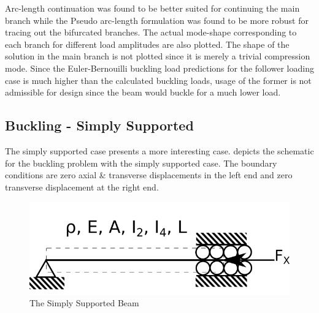 \documentclass[10pt]{article}
\begin{document}
Arc-length continuation was found to be better suited for continuing
the main branch while the Pseudo arc-length formulation was found to
be more robust for tracing out the bifurcated branches. The actual
mode-shape corresponding to each branch for different load amplitudes
are also plotted. The shape of the solution in the main branch is not
plotted since it is merely a trivial compression mode. Since the
Euler-Bernouilli buckling load predictions for the follower loading
case is much higher than the calculated buckling loads, usage of the
former is not admissible for design since the beam would buckle for a
much lower load.

\subsection{Buckling - Simply Supported}
\label{sec:buckl-simply-supp}

The simply supported case presents a more interesting
case.  depicts the schematic for the buckling
problem with the simply supported case. The boundary conditions are
zero axial \& transverse displacements in the left end and zero
transverse displacement at the right end.

\begin{figure}[!h]
  \centering
  \includegraphics[width=0.4\linewidth]{FIGS/simpsupp}
  \caption{The Simply Supported Beam}
  \label{fig:simpsupp}
\end{figure}
\end{document}
